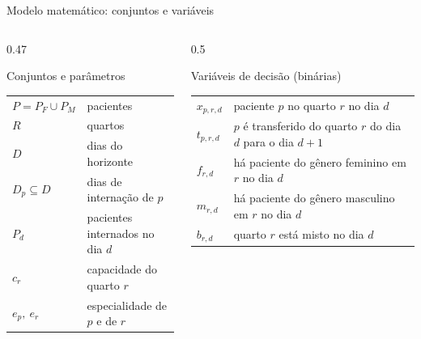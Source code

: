 \documentclass[aspectratio=169,10pt]{beamer}
\newcommand{\framerefs}{}
\newcommand{\slidecites}[1]{\gdef\framerefs{Referências: \cite{#1}}}
\gdef\framerefs{}%
\begin{document}
\begin{frame}{Modelo matemático: conjuntos e variáveis}
    \slidecites{ceschia2012modeling, ceschia2011local}
    \begin{columns}[t]
        \begin{column}{0.47\textwidth}
            \begin{block}{Conjuntos e parâmetros}
                \small
                \begin{tabular}{@{}ll@{}}
                    $P = P_F \cup P_M$ & pacientes \\
                    $R$ & quartos \\
                    $D$ & dias do horizonte \\
                    $D_p \subseteq D$ & dias de internação de $p$ \\
                    $P_d$ & pacientes internados no dia $d$ \\
                    $c_r$ & capacidade do quarto $r$ \\
                    $e_p,\ e_r$ & especialidade de $p$ e de $r$ \\
                \end{tabular}
            \end{block}
        \end{column}
        \begin{column}{0.5\textwidth}
            \begin{block}{Variáveis de decisão (binárias)}
                \small
                \begin{tabular}{@{}lp{4.9cm}@{}}
                    $x_{p,r,d}$ & paciente $p$ no quarto $r$ no dia $d$ \\
                    $t_{p,r,d}$ & $p$ é transferido do quarto $r$ do dia $d$ para o dia $d+1$ \\
                    $f_{r,d}$ & há paciente do gênero feminino em $r$ no dia $d$ \\
                    $m_{r,d}$ & há paciente do gênero masculino em $r$ no dia $d$ \\
                    $b_{r,d}$ & quarto $r$ está misto no dia $d$ \\
                \end{tabular}
            \end{block}
        \end{column}
    \end{columns}
\end{frame}
\end{document}
